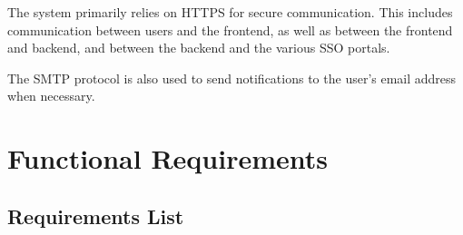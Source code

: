 \par The system primarily relies on HTTPS for secure communication. This includes communication between users and the
frontend, as well as between the frontend and backend, and between the backend and the various SSO portals.

\par The SMTP protocol is also used to send notifications to the user's email address when necessary.

\section{Functional Requirements}
\label{sec:functional-requirements}

\subsection{Requirements List}
\label{subsec:requirements-list}

\setcounter{requirementCounter}{0}
\newcommand{\nextRequirementID}{
    \stepcounter{requirementCounter}R\ifnum\value{requirementCounter}<10 0\fi\arabic{requirementCounter}
}

